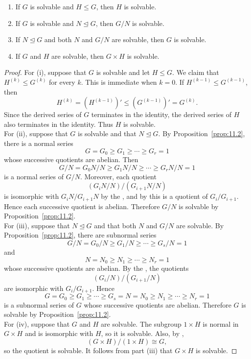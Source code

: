 \documentclass[../Odyssey_Project.tex]{subfiles}
\begin{document}
\begin{proposition}
\label{prop:11.3}
\begin{enumerate}
    \item[(i)] If $G$ is solvable and $H \leq G$, then $H$ is solvable.
    \item[(ii)] If $G$ is solvable and $N \trianglelefteq G$, then $G/N$ is solvable.
    \item[(iii)] If $N \trianglelefteq G$ and both $N$ and $G/N$ are solvable, then $G$ is solvable.
    \item[(iv)] If $G$ and $H$ are solvable, then $G \times H$ is solvable.
\end{enumerate}
\end{proposition}
\begin{proof}
    For (i), suppose that $G$ is solvable and let $H \leq G$. We claim that $H^{(k)} \leq G^{(k)}$ for every $k$. This is immediate when $k=0$. If $H^{(k-1)} \leq G^{(k-1)}$, then
    \[
        H^{(k)} = (H^{(k-1)})' \leq (G^{(k-1)})' = G^{(k)}.
    \]
    Since the derived series of $G$ terminates in the identity, the derived series of $H$ also terminates in the identity. Thus $H$ is solvable. \\
    For (ii), suppose that $G$ is solvable and that $N \trianglelefteq G$. By Proposition~\ref{prop:11.2}, there is a normal series
    \[
        G = G_0 \geq G_1 \geq \cdots \geq G_r = 1
    \]
    whose successive quotients are abelian. Then
    \[
        G/N = G_0N/N \geq G_1N/N \geq \cdots \geq G_rN/N = 1
    \]
    is a normal series of $G/N$. Moreover, each quotient
    \[
        (G_iN/N)/(G_{i+1}N/N)
    \]
    is isomorphic with $G_iN/G_{i+1}N$ by the , and by  this is a quotient of $G_i/G_{i+1}$. Hence each successive quotient is abelian. Therefore $G/N$ is solvable by Proposition~\ref{prop:11.2}. \\
    For (iii), suppose that $N \trianglelefteq G$ and that both $N$ and $G/N$ are solvable. By Proposition~\ref{prop:11.2}, there are subnormal series
    \[
        G/N = G_0/N \geq G_1/N \geq \cdots \geq G_s/N = 1
    \]
    and
    \[
        N = N_0 \geq N_1 \geq \cdots \geq N_r = 1
    \]
    whose successive quotients are abelian. By the , the quotients
    \[
        (G_i/N)/(G_{i+1}/N)
    \]
    are isomorphic with $G_i/G_{i+1}$. Hence
    \[
        G = G_0 \geq G_1 \geq \cdots \geq G_s = N = N_0 \geq N_1 \geq \cdots \geq N_r = 1
    \]
    is a subnormal series of $G$ whose successive quotients are abelian. Therefore $G$ is solvable by Proposition~\ref{prop:11.2}. \\
    For (iv), suppose that $G$ and $H$ are solvable. The subgroup $1\times H$ is normal in $G\times H$ and is isomorphic with $H$, so it is solvable. Also, by ,
    \[
        (G\times H)/(1\times H) \cong G,
    \]
    so the quotient is solvable. It follows from part (iii) that $G\times H$ is solvable.
\end{proof}
\end{document}
